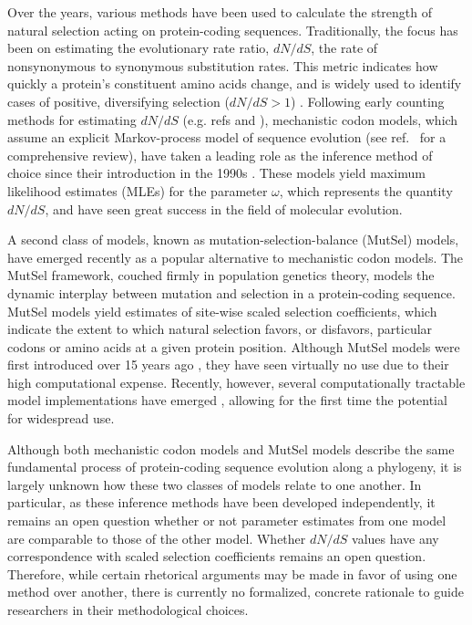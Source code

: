 \documentclass[11pt]{article}
\begin{document}
Over the years, various methods have been used to calculate the strength of natural selection acting on protein-coding sequences. Traditionally, the focus has been on estimating the evolutionary rate ratio, $dN/dS$, the rate of nonsynonymous to synonymous substitution rates. This metric indicates how quickly a protein's constituent amino acids change, and is widely used to identify cases of positive, diversifying selection ($dN/dS > 1$) \cite{NielsenYang1998, Yangetal2000, KosakovskyPondFrost2005, Huelsenbecketal2006}. Following early counting methods for estimating $dN/dS$ (e.g. refs \cite{LWL85} and \cite{NG86}), mechanistic codon models, which assume an explicit Markov-process model of sequence evolution (see ref.~\cite{Anisimova2009} for a comprehensive review), have taken a leading role as the inference method of choice since their introduction in the 1990s \cite{GoldmanYang1994, MuseGaut1994, NielsenYang1998}. These models yield maximum likelihood estimates (MLEs) for the parameter $\omega$, which represents the quantity $dN/dS$, and have seen great success in the field of molecular evolution. 

A second class of models, known as mutation-selection-balance (MutSel) models, have emerged recently as a popular alternative to mechanistic codon models. The MutSel framework, couched firmly in population genetics theory, models the dynamic interplay between mutation and selection in a protein-coding sequence. MutSel models yield estimates of site-wise scaled selection coefficients, which indicate the extent to which natural selection favors, or disfavors, particular codons or amino acids at a given protein position. Although MutSel models were first introduced over 15 years ago \cite{HalpernBruno1998}, they have seen virtually no use due to their high computational expense. Recently, however, several computationally tractable model implementations have emerged \cite{RodrigueLartillot2014,Tamurietal2014}, allowing for the first time the potential for widespread use. 

Although both mechanistic codon models and MutSel models describe the same fundamental process of protein-coding sequence evolution along a phylogeny, it is largely unknown how these two classes of models relate to one another. In particular, as these inference methods have been developed independently, it remains an open question whether or not parameter estimates from one model are comparable to those of the other model. Whether $dN/dS$ values have any correspondence with scaled selection coefficients remains an open question. Therefore, while certain rhetorical arguments may be made in favor of using one method over another, there is currently no formalized, concrete rationale to guide researchers in their methodological choices. 
\end{document}
